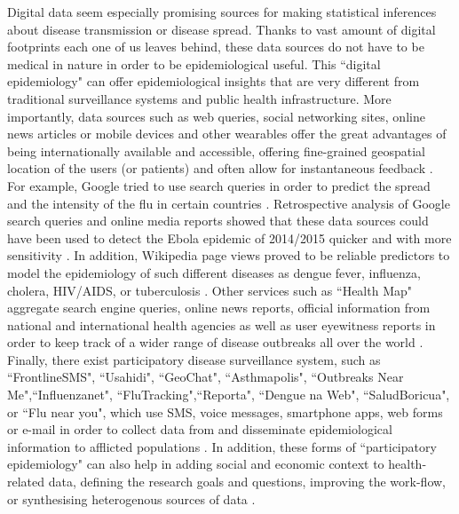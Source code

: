 \documentclass[11pt, a4paper,twoside]{report}\usepackage[]{graphicx}\usepackage[]{color}
\begin{document}
Digital data seem especially promising sources for making statistical inferences about disease transmission or disease spread. Thanks to vast amount of digital footprints each one of us leaves behind, these data sources do not have to be medical in nature in order to be epidemiological useful. This ``digital epidemiology" can offer epidemiological insights that are very different from traditional surveillance systems and public health infrastructure. More importantly, data sources such as web queries, social networking sites, online news articles or mobile devices and other wearables offer the great advantages of being internationally available and accessible, offering fine-grained geospatial location of the users (or patients) and often allow for instantaneous feedback \citep{salathe_digital_2012}. For example, Google tried to use search queries in order to predict the spread and the intensity of the flu in certain countries \citep{ginsberg_detecting_2009}. Retrospective analysis of Google search queries and online media reports showed that these data sources could have been used to detect the Ebola epidemic of 2014/2015 quicker and with more sensitivity \citep{anema_digital_2014, milinovich_role_2015}.
In addition, Wikipedia page views proved to be reliable predictors to model the epidemiology of such different diseases as dengue fever, influenza, cholera, HIV/AIDS, or tuberculosis \citep{generous_global_2014}. 
Other services such as ``Health Map" aggregate search engine queries, online news reports, official information from national and international health agencies as well as user eyewitness reports in order to keep track of a wider range of disease outbreaks all over the world \citep{brownstein_surveillance_2008,freifeld_healthmap:_2008}.
Finally, there exist participatory disease surveillance system, such as ``FrontlineSMS", ``Usahidi", ``GeoChat", ``Asthmapolis", ``Outbreaks Near Me",``Influenzanet", ``FluTracking",``Reporta", ``Dengue na Web", ``SaludBoricua", or ``Flu near you", which use SMS, voice messages, smartphone apps, web forms or e-mail in order to collect data from and disseminate epidemiological information to afflicted populations \citep{freifeld_participatory_2010,chunara_flu_2013,wojcik_public_2014,chunara_estimating_2015}. In addition, these forms of ``participatory epidemiology" can also help in adding social and economic context to health-related data, defining the research goals and questions, improving the work-flow, or synthesising heterogenous sources of data \citep{bach_participatory_2017,liu_assessing_2017}.\newline
\end{document}
